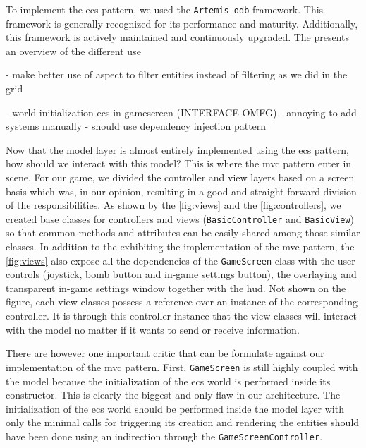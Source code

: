 
To implement the \gls{ecs} pattern, we used the \texttt{Artemis-odb} framework.\cite{artemis-odb} This framework is generally recognized for its performance and maturity. Additionally, this framework is actively maintained and continuously upgraded. The
presents an overview of the different use

- make better use of aspect to filter entities instead of filtering as we did in the grid

- world initialization ecs in gamescreen (INTERFACE OMFG)
- annoying to add systems manually
- should use dependency injection pattern


Now that the model layer is almost entirely implemented using the \gls{ecs} pattern, how should we interact with this model? This is where the \gls{mvc} pattern enter in scene. For our game, we divided the controller and view layers based on a screen basis which was, in our opinion, resulting in a good and straight forward division of the responsibilities. As shown by the \autoref{fig:views} and the \autoref{fig:controllers}, we created base classes for controllers and views (\texttt{BasicController} and \texttt{BasicView}) so that common methods and attributes can be easily shared among those similar classes. In addition to the exhibiting the implementation of the \gls{mvc} pattern, the \autoref{fig:views} also expose all the dependencies of the \texttt{GameScreen} class with the user controls (joystick, bomb button and in-game settings button), the overlaying and transparent in-game settings window together with the \gls{hud}. Not shown on the figure, each view classes possess a reference over an instance of the corresponding controller. It is through this controller instance that the view classes will interact with the model no matter if it wants to send or receive information. \\


There are however one important critic that can be formulate against our implementation of the \gls{mvc} pattern. First, \texttt{GameScreen} is still highly coupled with the model because the initialization of the \gls{ecs} world is performed inside its constructor. This is clearly the biggest and only flaw in our architecture. The initialization of the \gls{ecs} world should be performed inside the model layer with only the minimal calls for triggering its creation and rendering the entities should have been done using an indirection through the \texttt{GameScreenController}. \\

